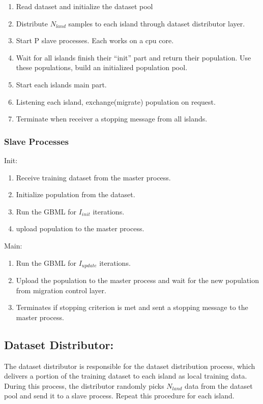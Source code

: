 \documentclass[conference]{IEEEtran}
\begin{document}
  \begin{enumerate}[leftmargin=4\parindent,label = \alph*)]
    \item Read dataset and initialize the dataset pool
    \item Distribute $N_{land}$ samples to each island through dataset distributor layer.
    \item Start P slave processes. Each works on a cpu core.
    \item Wait for all islands finish their “init” part and return their population. Use these populations, build an initialized population pool.
    \item Start each islands main part.
    \item Listening each island, exchange(migrate) population on request.
    \item Terminate when receiver a stopping message from all islands.
  \end{enumerate}

  \subsubsection{Slave Processes}\mbox{}
  
  Init:
  \begin{enumerate}[leftmargin =4\parindent,label = \alph*)]
  \item Receive training dataset from the master process.
  \item Initialize population from the dataset.
  \item Run the GBML for $I_{init}$ iterations.
  \item upload population to the master process.
  \end{enumerate}

  Main:
  \begin{enumerate}[leftmargin=4\parindent,label = \alph*)]
  \item Run the GBML for $I_{update}$ iterations.
  \item Upload the population to the master process and wait for the new population from migration control layer.
  \item Terminates if stopping criterion is met and sent a stopping message to the master process.
  \end{enumerate}

	\subsection{Dataset Distributor:}
	The dataset distributor is responsible for the dataset distribution process, which delivers a portion of the training dataset to each island as local training data. During this process, the distributor randomly picks $N_{land}$ data from the dataset pool and send it to a slave process. Repeat this procedure for each island.
\end{document}
